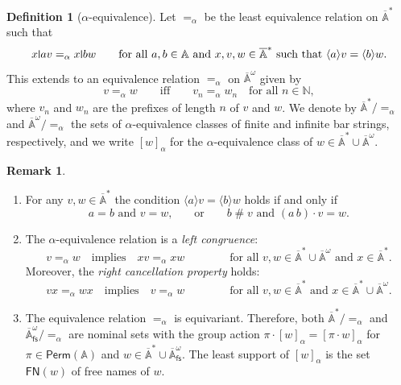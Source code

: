 \documentclass[final,a4paper,UKenglish,thm-restate,autoref,numberwithinsect]{lipics-v2021}
\newcommand{\midmid}{\hspace{0.2ex}{\rule[-0.1ex]{0.6pt}{1.65ex}}\hspace{0.2ex}}
\newcommand{\newletter}[1]{{\midmid}#1}
\renewcommand{\o}{\cdot}
\newcommand{\free}[1]{\mathsf{FN}(#1)}
\newcommand{\barA}{\overline{\names}}
\numberwithin{equation}{section}
\newcommand{\Perm}{\mathsf{Perm}}
\newcommand{\braket}[1]{\langle #1 \rangle}
\newcommand{\fs}{\mathsf{fs}}
\newcommand{\Nat}{{\mathbb{N}}}
\newcommand{\+}[1]{\mathcal{#1}\xspace}
\newcommand{\names}{\mathbb{A}}
\DeclareMathOperator{\supp}{\mathsf{supp}} %
\newcommand{\fresh}{\mathbin{\#}}
\theoremstyle{definition}
\newtheorem{defn}[theorem]{Definition}
\newtheorem{rem}[theorem]{Remark}
\begin{document}
\begin{defn}[$\alpha$-equivalence]\label{def:alpha-fin}
  Let $=_\alpha$ be the least equivalence relation on $\barA^*$ such that
  \[
    x\newletter av =_\alpha x\newletter bw
    \qquad
    \text{for all $a,b\in \names$ and $x,v,w\in \barA^*$ such that
      $\braket{a} v = \braket{b} w$}.
  \]
This extends to an equivalence relation $=_\alpha$ on $\barA^\omega$  given by \[v=_\alpha w \qquad\text{iff}\qquad v_n=_\alpha w_n \quad\text{for all $n\in \Nat$},\] 
where $v_n$ and $w_n$ are the prefixes of length $n$ of $v$ and $w$. We denote by $\barA^*/\mathord{=_\alpha}$ and $\barA^\omega/\mathord{=_\alpha}$ the sets of $\alpha$-equivalence classes of finite and infinite bar strings, respectively, and we write $[w]_\alpha$ for the $\alpha$-equivalence class of $w\in \barA^*\cup \barA^\omega$.
\end{defn}
%
\begin{rem}\label{rem:alpheq-technical}
  \begin{enumerate}
  \item For any $v,w\in \barA^*$ the condition $\braket{a} v = \braket{b} w$ holds if
    and only if
    \[
      \text{$a=b$ and $v=w$,}
      \qquad \text{or}\qquad
      \text{$b\fresh v$ and $(a\, b)\o v = w$.}
    \]
  \item The $\alpha$-equivalence relation is a \emph{left congruence}: 
    \[
      v=_\alpha w\quad\text{implies}\quad xv=_\alpha xw
      \qquad\qquad
      \text{for all $v,w\in \barA^*\cup \barA^\omega$ and $x\in \barA^*$.}
    \]
    Moreover, the \emph{right cancellation property} holds:
    \[
      vx=_\alpha wx \quad\text{implies}\quad v=_\alpha w
      \qquad\qquad
      \text{for all $v,w\in \barA^*$ and $x\in \barA^*\cup \barA^\omega$.}
    \]
  \item The equivalence relation $=_\alpha$ is equivariant. Therefore, both $\barA^*/{=_\alpha}$ and $\barA^\omega_\fs/{=_\alpha}$ are nominal sets with the group action $\pi\o [w]_\alpha = [\pi\o w]_\alpha$ for $\pi\in \Perm(\names)$ and $w\in \barA^*\cup \barA^\omega_\fs$.
  The least support of $[w]_\alpha$ is
    the set $\free{w}$ of free names of $w$.
  \end{enumerate}
\end{rem}
\end{document}
